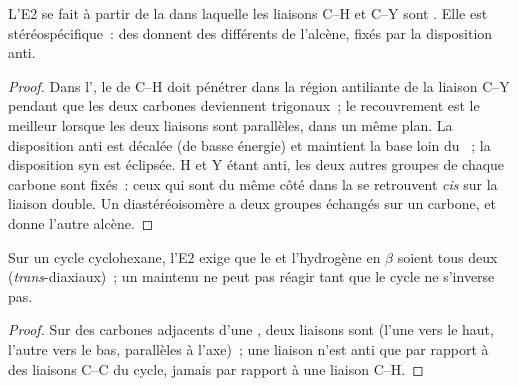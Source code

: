 \begin{proposition}\label{prop:b1:elimination:anti}
L'E2 se fait à partir de la  dans laquelle les liaisons
C--H et C--Y sont . Elle est stéréospécifique~: des
  donnent des  différents de
l'alcène, fixés par la disposition anti.
\end{proposition}

\begin{proof}
Dans l', le  de C--H doit pénétrer dans
la région antiliante de la liaison C--Y pendant que les deux carbones
deviennent trigonaux~; le recouvrement est le meilleur lorsque les deux
liaisons sont parallèles, dans un même plan. La disposition anti est
décalée (de basse énergie) et maintient la base loin du ~; la disposition syn est éclipsée. H et Y étant anti, les deux
autres groupes de chaque carbone sont fixés~: ceux qui sont du même côté
dans la  se retrouvent \textit{cis} sur la liaison
double. Un diastéréoisomère a deux groupes échangés sur un carbone, et
donne l'autre alcène.
\end{proof}

\begin{proposition}\label{prop:b1:elimination:cyclohexane-e2}
Sur un cycle cyclohexane, l'E2 exige que le  et
l'hydrogène en $\beta$ soient tous deux  (\textit{trans}-diaxiaux)~;
un  maintenu  ne peut pas réagir tant que le
cycle ne s'inverse pas.
\end{proposition}

\begin{proof}
Sur des carbones adjacents d'une , deux liaisons  sont
 (l'une vers le haut, l'autre vers le bas, parallèles à
l'axe)~; une liaison  n'est anti que par rapport à des
liaisons C--C du cycle, jamais par rapport à une liaison C--H.
\end{proof}

